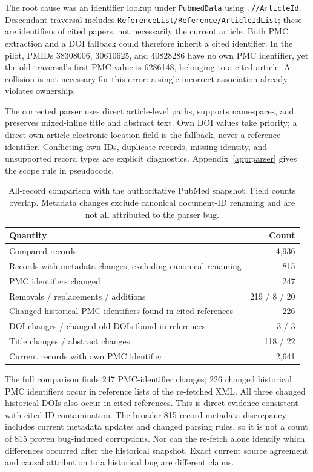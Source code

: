 The root cause was an identifier lookup under \texttt{PubmedData} using \texttt{.//ArticleId}. Descendant traversal includes \texttt{ReferenceList/Reference/ArticleIdList}; these are identifiers of cited papers, not necessarily the current article. Both PMC extraction and a DOI fallback could therefore inherit a cited identifier. In the pilot, PMIDs 38308006, 30610625, and 40828286 have no own PMC identifier, yet the old traversal's first PMC value is 6286148, belonging to a cited article. A collision is not necessary for this error: a single incorrect association already violates ownership.

The corrected parser uses direct article-level paths, supports namespaces, and preserves mixed-inline title and abstract text. Own DOI values take priority; a direct own-article electronic-location field is the fallback, never a reference identifier. Conflicting own IDs, duplicate records, missing identity, and unsupported record types are explicit diagnostics. Appendix~\ref{app:parser} gives the scope rule in pseudocode.

\begin{table}[t]
\centering
\caption{All-record comparison with the authoritative PubMed snapshot. Field counts overlap. Metadata changes exclude canonical document-ID renaming and are not all attributed to the parser bug.}
\label{tab:identity}
\begin{tabular}{@{}lr@{}}
\toprule
Quantity & Count \\
\midrule
Compared records & 4,936 \\
Records with metadata changes, excluding canonical renaming & 815 \\
PMC identifiers changed & 247 \\
\quad Removals / replacements / additions & 219 / 8 / 20 \\
Changed historical PMC identifiers found in cited references & 226 \\
DOI changes / changed old DOIs found in references & 3 / 3 \\
Title changes / abstract changes & 118 / 22 \\
Current records with own PMC identifier & 2,641 \\
\bottomrule
\end{tabular}
\end{table}

The full comparison finds 247 PMC-identifier changes; 226 changed historical PMC identifiers occur in reference lists of the re-fetched XML. All three changed historical DOIs also occur in cited references. This is direct evidence consistent with cited-ID contamination. The broader 815-record metadata discrepancy includes current metadata updates and changed parsing rules, so it is not a count of 815 proven bug-induced corruptions. Nor can the re-fetch alone identify which differences occurred after the historical snapshot. Exact current source agreement and causal attribution to a historical bug are different claims.

